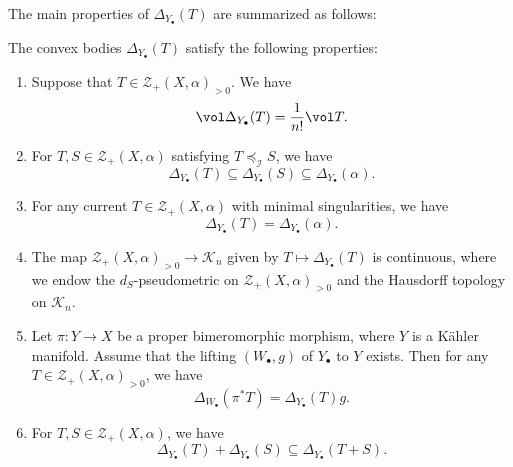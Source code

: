 The main properties of $\Delta_{Y_{\bullet}}(T)$ are summarized as follows:
\begin{theorem}\label{thm:pobmain}
The convex bodies $\Delta_{Y_{\bullet}}(T)$ satisfy the following properties:
\begin{enumerate}
    \item\label{itm:thm:pobmain:1} Suppose that $T\in \mathcal{Z}_+(X,\alpha)_{>0}$. We have
    \begin{equation}\label{eq:volpobgeneral}
        \vol \Delta_{Y_{\bullet}}(T)=\frac{1}{n!}\vol T.
    \end{equation}
    \item\label{itm:thm:pobmain:2} For $T,S \in \mathcal{Z}_+(X,\alpha)$ satisfying $T\preceq_{\mathcal{I}}S$, we have
    \[
        \Delta_{Y_{\bullet}}(T)\subseteq \Delta_{Y_{\bullet}}(S)\subseteq \Delta_{Y_{\bullet}}(\alpha).
    \]
    \item\label{itm:thm:pobmain:3} For any current $T\in \mathcal{Z}_+(X,\alpha)$ with minimal singularities, we have
    \[
    \Delta_{Y_{\bullet}}(T)=\Delta_{Y_{\bullet}}(\alpha).
    \]
    \item\label{itm:thm:pobmain:4} The map $\mathcal{Z}_+(X,\alpha)_{>0}\rightarrow \mathcal{K}_n$ given by $T\mapsto \Delta_{Y_{\bullet}}(T)$ is continuous, where we endow the $d_S$-pseudometric on $\mathcal{Z}_+(X,\alpha)_{>0}$ and the Hausdorff topology on $\mathcal{K}_n$.
    \item\label{itm:thm:pobmain:5} Let $\pi\colon Y\rightarrow X$ be a proper bimeromorphic morphism, where $Y$ is a Kähler manifold. Assume that the lifting $(W_{\bullet},g)$ of $Y_{\bullet}$ to $Y$ exists. Then for any $T\in \mathcal{Z}_+(X,\alpha)_{>0}$, we have
    \[
        \Delta_{W_{\bullet}}(\pi^*T)=\Delta_{Y_{\bullet}}(T)g.
    \]
    \item\label{itm:thm:pobmain:6} For $T,S\in \mathcal{Z}_+(X,\alpha)$, we have
    \begin{equation}\label{eq:pobadditiv}
    \Delta_{Y_{\bullet}}(T)+\Delta_{Y_{\bullet}}(S)\subseteq \Delta_{Y_{\bullet}}(T+S).
    \end{equation}
\end{enumerate}
\end{theorem}

